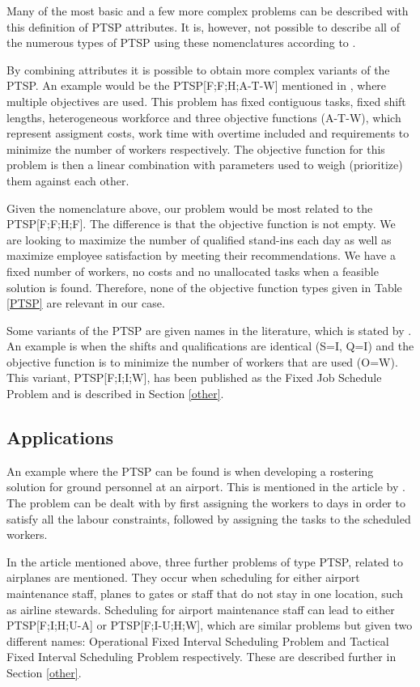 Many of the most basic and a few more complex problems can be described with this definition of PTSP attributes. It is, however, not possible to describe all of the numerous types of PTSP using these nomenclatures according to \citet{krishnamoorthy_2001}.

By combining attributes it is possible to obtain more complex variants of the PTSP. An example would be the PTSP[F;F;H;A-T-W] mentioned in \citet{krishnamoorthy_2001}, where multiple objectives are used. This problem has fixed contiguous tasks, fixed shift lengths, heterogeneous workforce and three objective functions (A-T-W), which represent assigment costs, work time with overtime included and requirements to minimize the number of workers respectively. The objective function for this problem is then a linear combination with parameters used to weigh (prioritize) them against each other.

Given the nomenclature above, our problem would be most related to the PTSP[F;F;H;F]. The difference is that the objective function is not empty. We are looking to maximize the number of qualified stand-ins each day as well as maximize employee satisfaction by meeting their recommendations. We have a fixed number of workers, no costs and no unallocated tasks when a feasible solution is found. Therefore, none of the objective function types given in Table \ref{PTSP} are relevant in our case.

Some variants of the PTSP are given names in the literature, which is stated by \citet{krishnamoorthy_2001}. An example is when the shifts and qualifications are identical (S=I, Q=I) and the objective function is to minimize the number of workers that are used (O=W). This variant, PTSP[F;I;I;W], has been published as the Fixed Job Schedule Problem and is described in Section \ref{other}.

\subsection{Applications}
An example where the PTSP can be found is when developing a rostering solution for ground personnel at an airport. This is mentioned in the article by \citet{krishnamoorthy_2001}. The problem can be dealt with by first assigning the workers to days in order to satisfy all the labour constraints, followed by assigning the tasks to the scheduled workers.

In the article mentioned above, three further problems of type PTSP, related to airplanes are mentioned. They occur when scheduling for either airport maintenance staff, planes to gates or staff that do not stay in one location, such as airline stewards. Scheduling for airport maintenance staff can lead to either PTSP[F;I;H;U-A] or PTSP[F;I-U;H;W], which are similar problems but given two different names: Operational Fixed Interval Scheduling Problem and Tactical Fixed Interval Scheduling Problem respectively. These are described further in Section \ref{other}. 

